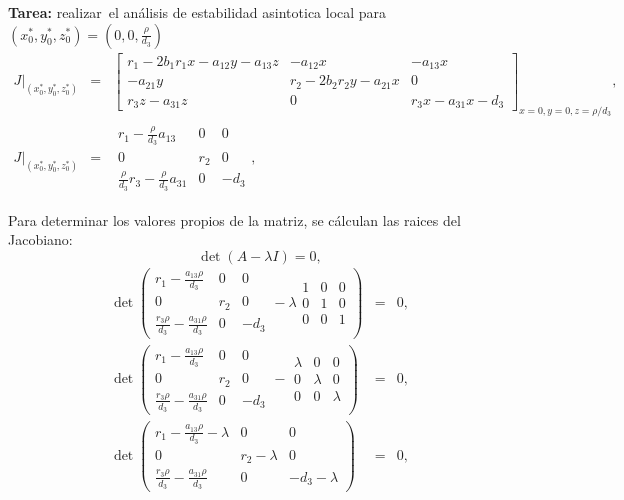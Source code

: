 \documentclass[letterpaper,11pt]{article}
\begin{document}
\textbf{Tarea:} realizar\ el an\'{a}lisis de estabilidad asintotica local
para $\left( x_{0}^{\ast },y_{0}^{\ast },z_{0}^{\ast }\right) =\left( 0,0,%
\frac{\rho }{d_{3}}\right) $%
\begin{eqnarray*}
\left. J\right\vert _{\left( x_{0}^{\ast },y_{0}^{\ast },z_{0}^{\ast
}\right) } &=&\left[ 
\begin{array}{ccc}
r_{1}-2b_{1}r_{1}x-a_{12}y-a_{13}z & -a_{12}x & -a_{13}x \\ 
-a_{21}y & r_{2}-2b_{2}r_{2}y-a_{21}x & 0 \\ 
r_{3}z-a_{31}z & 0 & r_{3}x-a_{31}x-d_{3}%
\end{array}%
\allowbreak \right] _{x=0,y=0,z=\rho /d_{3}}, \\
\left. J\right\vert _{\left( x_{0}^{\ast },y_{0}^{\ast },z_{0}^{\ast
}\right) } &=&%
\begin{array}{ccc}
r_{1}-\frac{\rho }{d_{3}}a_{13} & 0 & 0 \\ 
0 & r_{2} & 0 \\ 
\frac{\rho }{d_{3}}r_{3}-\frac{\rho }{d_{3}}a_{31} & 0 & -d_{3}%
\end{array}%
,
\end{eqnarray*}

Para determinar los valores propios de la matriz, se c\'{a}lculan las raices
del Jacobiano:%
\begin{equation*}
\det \left( A-\lambda I\right) =0,
\end{equation*}%
\begin{eqnarray*}
\det \left( 
\begin{array}{ccc}
r_{1}-\frac{a_{13}\rho }{d_{3}} & 0 & 0 \\ 
0 & r_{2} & 0 \\ 
\frac{r_{3}\rho }{d_{3}}-\frac{a_{31}\rho }{d_{3}} & 0 & -d_{3}%
\end{array}%
-\lambda 
\begin{array}{ccc}
1 & 0 & 0 \\ 
0 & 1 & 0 \\ 
0 & 0 & 1%
\end{array}%
\right) &=&0, \\
\det \left( 
\begin{array}{ccc}
r_{1}-\frac{a_{13}\rho }{d_{3}} & 0 & 0 \\ 
0 & r_{2} & 0 \\ 
\frac{r_{3}\rho }{d_{3}}-\frac{a_{31}\rho }{d_{3}} & 0 & -d_{3}%
\end{array}%
-%
\begin{array}{ccc}
\lambda & 0 & 0 \\ 
0 & \lambda & 0 \\ 
0 & 0 & \lambda%
\end{array}%
\right) &=&0, \\
\det \left( 
\begin{array}{ccc}
r_{1}-\frac{a_{13}\rho }{d_{3}}-\lambda & 0 & 0 \\ 
0 & r_{2}-\lambda & 0 \\ 
\frac{r_{3}\rho }{d_{3}}-\frac{a_{31}\rho }{d_{3}} & 0 & -d_{3}-\lambda%
\end{array}%
\right) &=&0,
\end{eqnarray*}
\end{document}
